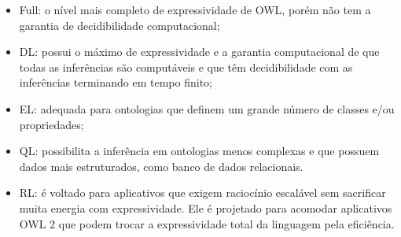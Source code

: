         \begin{itemize}
        	\item Full: o nível mais completo de expressividade de OWL, porém não tem a garantia de decidibilidade computacional;
            \item DL: possui o máximo de expressividade e a garantia computacional de que todas as inferências são computáveis e que têm decidibilidade com as inferências terminando em tempo finito;
            \item EL: adequada para ontologias que definem um grande número de classes e/ou propriedades;
            \item QL: possibilita a inferência em ontologias menos complexas e que possuem dados mais estruturados, como banco de dados relacionais.
            \item RL: é voltado para aplicativos que exigem raciocínio escalável sem sacrificar muita energia com expressividade. Ele é projetado para acomodar aplicativos OWL 2 que podem trocar a expressividade total da linguagem pela eficiência.
        \end{itemize}